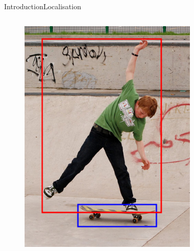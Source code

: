 \begin{frame}{Introduction}{Localisation}
\begin{columns}
\begin{figure}
            \includegraphics[width=1.0 \textwidth]{figs/objfieldsbbox.png}
        \end{figure}
            \begin{figure}

\end{figure}
\end{columns}
\end{frame}
